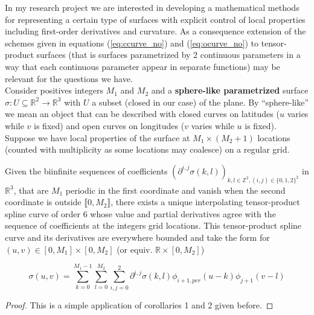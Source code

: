 \documentclass[a4paper, 11pt]{article}
\begin{document}
In my research project we are interested in developing a mathematical methods for representing a certain type of 
surfaces with explicit control of local properties including first-order derivatives and curvature. As a consequence 
extension of the schemes given in equations (\ref{eq:ccurve_no}) and (\ref{eq:ocurve_no}) to tensor-product surfaces 
(that is surfaces parametrized by 2 continuous parameters in a way that each continuous parameter appear in separate 
functions) may be relevant for the questions we have. \\ 

Consider positives integers $M_1$ and $M_2$ and a \textbf{sphere-like parametrized} surface $\sigma: U \subseteq 
\mathbb{R}^2 \to \mathbb{R}^3$ with $U$ a subset (closed in our case) of the plane. By “sphere-like” we mean an object 
that can be described with closed curves on latitudes ($u$ varies while $v$ is fixed) and open curves on longitudes ($v$ 
varies while $u$ is fixed). Suppose we have local properties of the surface at $M_1\times(M_2+1)$ locations (counted 
with multiplicity as some locations may coalesce) on a regular grid. \\ 

\begin{cor}{5}
  Given the biinfinite sequences of coefficients ${(\partial^{i,j}\sigma(k,l))}_{k, l \in \mathbb{Z}^2, (i,j) \in 
  {\{0,1,2\}}^2}$ in $\mathbb{R}^3$, that are $M_1$ periodic in the first coordinate and vanish when the second 
  coordinate is outside $\llbracket 0, M_2 \rrbracket$, there exists a unique interpolating tensor-product spline curve 
  of order $6$ whose value and partial derivatives agree with the sequence of coefficients at the integers grid 
  locations.  This tensor-product spline curve and its derivatives are everywhere bounded and take the form for $(u,v) 
  \in [0,M_1]\times[0, M_2]$ (or equiv.
  $\mathbb{R}\times[0, M_2]$)

  \begin{equation}
    \sigma(u,v) = \sum_{k=0}^{M_1-1} \sum_{l=0}^{M_2} \sum_{i,j = 0}^2 \partial^{i,j} \sigma(k,l) \phi_{i+1, per}(u-k) 
    \phi_{j+1}(v-l)
  \end{equation}
\end{cor}

\begin{proof}
  This is a simple application of corollaries 1 and 2 given before.
\end{proof}
\end{document}
